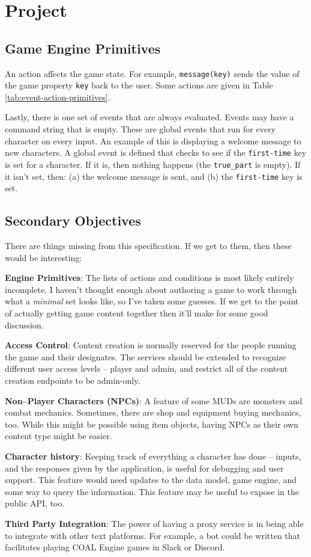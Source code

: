 \documentclass{article}
\newcommand{\enterProblemHeader}[1]{
}
\newcommand{\exitProblemHeader}[1]{
\nobreak\extramarks{#1}{}\nobreak
}
\newcounter{homeworkProblemCounter} %
\newcommand{\homeworkProblemName}{}
\newenvironment{homeworkProblem}[1][Problem \arabic{homeworkProblemCounter}]{ %
\stepcounter{homeworkProblemCounter} %
\renewcommand{\homeworkProblemName}{#1} %
\section{\homeworkProblemName} %
\enterProblemHeader{\homeworkProblemName} %
}{
\exitProblemHeader{\homeworkProblemName} %
}
\newcommand{\homeworkSectionName}{}
\newenvironment{homeworkSection}[1]{ %
\renewcommand{\homeworkSectionName}{#1} %
\subsection{\homeworkSectionName} %
\enterProblemHeader{\homeworkProblemName\ [\homeworkSectionName]} %
}{
\enterProblemHeader{\homeworkProblemName} %
}
\begin{document}
\begin{homeworkProblem}[Project]
\begin{homeworkSection}{Game Engine Primitives}
	An action affects the game state. For example, \texttt{message(key)} sends the value of the game property \texttt{key} back to the user. Some actions are given in Table \ref{tab:event-action-primitives}.

	Lastly, there is one set of events that are always evaluated. Events may have a command string that is empty. These are global events that run for every character on every input. An example of this is displaying a welcome message to new characters. A global event is defined that checks to see if the \texttt{first-time} key is set for a character. If it is, then nothing happens (the \texttt{true\_part} is empty). If it isn't set, then: (a) the welcome message is sent, and (b) the \texttt{first-time} key is set.
\end{homeworkSection}


\begin{homeworkSection}{Secondary Objectives}
	There are things missing from this specification. If we get to them, then these would be interesting:
	\begin{compactitem}
		\item \textbf{Engine Primitives}: The lists of actions and conditions is most likely entirely incomplete. I haven't thought enough about authoring a game to work through what a \textit{minimal} set looks like, so I've taken some guesses. If we get to the point of actually getting game content together then it'll make for some good discussion.
		\item \textbf{Access Control}: Content creation is normally reserved for the people running the game and their designates. The services should be extended to recognize different user access levels -- player and admin, and restrict all of the content creation endpoints to be admin-only.
		\item \textbf{Non--Player Characters (NPCs)}: A feature of some MUDs are monsters and combat mechanics. Sometimes, there are shop and equipment buying mechanics, too. While this might be possible using item objects, having NPCs as their own content type might be easier.
		\item \textbf{Character history}: Keeping track of everything a character has done -- inputs, and the responses given by the application, is useful for debugging and user support. This feature would need updates to the data model, game engine, and some way to query the information. This feature may be useful to expose in the public API, too.
		\item \textbf{Third Party Integration}: The power of having a proxy service is in being able to integrate with other text platforms. For example, a bot could be written that facilitates playing COAL Engine games in Slack or Discord.
	\end{compactitem}
\end{homeworkSection}

\end{homeworkProblem}
\end{document}
